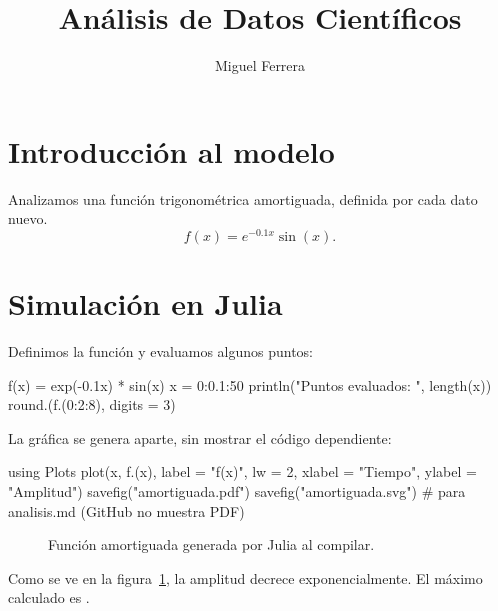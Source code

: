 \documentclass[a4paper]{article}
\title{Análisis de Datos Científicos}
\author{Miguel Ferrera}
\begin{document}
\maketitle

\section{Introducción al modelo}

Analizamos una función trigonométrica amortiguada, definida por cada dato nuevo.
\begin{equation}
  f(x) = e^{-0.1x} \sin(x).
\end{equation}

\section{Simulación en Julia}

Definimos la función y evaluamos algunos puntos:

\begin{juliacode}
f(x) = exp(-0.1x) * sin(x)
x = 0:0.1:50
println("Puntos evaluados: ", length(x))
round.(f.(0:2:8), digits = 3)
\end{juliacode}

La gráfica se genera aparte, sin mostrar el código dependiente:

\begin{juliarun}
using Plots
plot(x, f.(x), label = "f(x)", lw = 2, xlabel = "Tiempo", ylabel = "Amplitud")
savefig("amortiguada.pdf")
savefig("amortiguada.svg") # para analisis.md (GitHub no muestra PDF)
\end{juliarun}

\begin{figure}[htbp]
  \centering
  \caption{Función amortiguada generada por Julia al compilar.}%
  \label{fig:amortiguada}
\end{figure}

Como se ve en la figura~\ref{fig:amortiguada}, la amplitud decrece
exponencialmente. El máximo calculado es .
\end{document}
